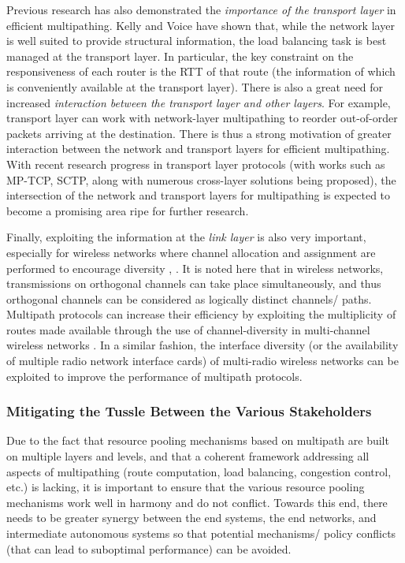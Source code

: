 \documentclass[10pt]{IEEEtran}
\begin{document}
\vspace{1mm}
Previous research has also demonstrated the \textit{importance of the transport layer} in efficient multipathing. Kelly and Voice \cite{kelly2005stability} have shown that, while the network layer is well suited to provide structural information, the load balancing task is best managed at the transport layer. In particular, the key constraint on the responsiveness of each router is the RTT of that route (the information of which is conveniently available at the transport layer).  There is also a great need for increased \textit{interaction between the transport layer and other layers}. For example, transport layer can work with network-layer multipathing to reorder out-of-order packets arriving at the destination. There is thus a strong motivation of greater interaction between the network and transport layers for efficient multipathing. With recent research progress in transport layer protocols (with works such as MP-TCP, SCTP, along with numerous cross-layer solutions \cite{he2007towards} being proposed), the intersection of the network and transport layers for multipathing is expected to become a promising area ripe for further research. 

\vspace{1mm}
Finally, exploiting the information at the \textit{link layer} is also very important, especially for wireless networks where channel allocation and assignment are performed to encourage diversity \cite{mir2012unified}, \cite{farooq2013game}. It is noted here that in wireless networks, transmissions on orthogonal channels can take place simultaneously, and thus orthogonal channels can be considered as logically distinct channels/ paths. Multipath protocols can increase their efficiency by exploiting the multiplicity of routes made available through the use of channel-diversity in multi-channel wireless networks \cite{zeeshan2010backup}. In a similar fashion, the interface diversity (or the availability of multiple radio network interface cards) of multi-radio  wireless networks \cite{hassan2013quantifying} can be exploited to improve the performance of multipath protocols. 

\vspace{2mm}
\subsubsection{Mitigating the Tussle Between the Various Stakeholders}

Due to the fact that resource pooling mechanisms based on multipath are built on multiple layers and levels, and that a coherent framework addressing all aspects of multipathing (route computation, load balancing, congestion control, etc.) is lacking, it is important to ensure that the various resource pooling mechanisms work well in harmony and do not conflict. Towards this end, there needs to be greater synergy between the end systems, the end networks, and intermediate autonomous systems so that potential mechanisms/ policy conflicts (that can lead to suboptimal performance) can be avoided. 
\end{document}
